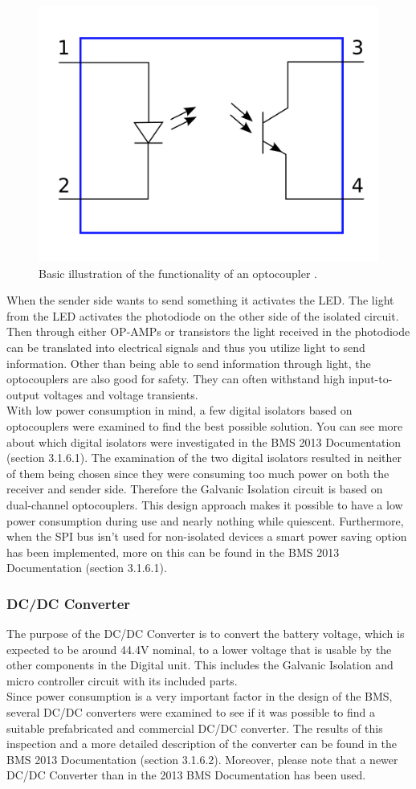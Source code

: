 \begin{figure}[H]
	\centering
	\includegraphics[width=0.5\linewidth]{Hardware/Pictures/BMSoptocoup}
	\caption[Empty]{Basic illustration of the functionality of an optocoupler \cite{OptoIllu}.}
	\label{fig:BMSoptocoup}
\end{figure}

When the sender side wants to send something it activates the LED. The light from the LED activates the photodiode on the other side of the isolated circuit. Then through either OP-AMPs or transistors the light received in the photodiode can be translated into electrical signals and thus you utilize light to send information. Other than being able to send information through light, the optocouplers are also good for safety. They can often withstand high input-to-output voltages and voltage transients. \\
With low power consumption in mind, a few digital isolators based on optocouplers were examined to find the best possible solution. You can see more about which digital isolators were investigated in the BMS 2013 Documentation \cite{BMSDocumentation} (section 3.1.6.1). The examination of the two digital isolators resulted in neither of them being chosen since they were consuming too much power on both the receiver and sender side. Therefore the Galvanic Isolation circuit is based on dual-channel optocouplers. This design approach makes it possible to have a low power consumption during use and nearly nothing while quiescent. Furthermore, when the SPI bus isn't used for non-isolated devices a smart power saving option has been implemented, more on this can be found in the BMS 2013 Documentation \cite{BMSDocumentation} (section 3.1.6.1).

\subsubsection{DC/DC Converter}
The purpose of the DC/DC Converter is to convert the battery voltage, which is expected to be around 44.4V nominal, to a lower voltage that is usable by the other components in the Digital unit. This includes the Galvanic Isolation and micro controller circuit with its included parts. \\
Since power consumption is a very important factor in the design of the BMS, several DC/DC converters were examined to see if it was possible to find a suitable prefabricated and commercial DC/DC converter. The results of this inspection and a more detailed description of the converter can be found in the BMS 2013 Documentation \cite{BMSDocumentation} (section 3.1.6.2). Moreover, please note that a newer DC/DC Converter than in the 2013 BMS Documentation has been used. 



